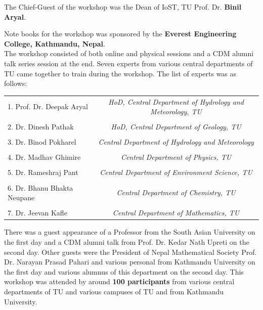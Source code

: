 \documentclass[a4paper,12pt]{report}
\begin{document}
\vspace{5mm}
\noindent
The Chief-Guest of the workshop was the Dean of IoST, TU Prof. Dr. \textbf{Binil Aryal}.
\clearpage

\noindent
Note books for the workshop was sponsored by the \textbf{Everest Engineering College, Kathmandu, Nepal}.\\
The workshop consisted of both online and physical sessions and a CDM alumni talk series session at the end. Seven experts from various central departments of TU came together to train during the workshop. The list of experts was as follows:


\begin{table}[h!]
\centering
  \begin{tcolorbox}[colframe=blue!52, colback=white, width=\linewidth]
\centering  \footnotesize
\begin{tabular}{l||c}

    1. Prof. Dr. Deepak Aryal &
    \textit{HoD, Central Department of Hydrology and Meteorology, TU}\\
    \\
    2. Dr. Dinesh Pathak &
    \textit{HoD, Central Department of Geology, TU}\\
    \\
    3. Dr. Binod Pokharel &
    \textit{Central Department of Hydrology and Meteorology}\\
    \\
    4. Dr. Madhav Ghimire &
    \textit{Central Department of Physics, TU}\\
    \\
    5. Dr. Rameshraj Pant &
    \textit{Central Department of Environment Science, TU}\\
    \\
    6. Dr. Bhanu Bhakta Neupane &
    \textit{Central Department of Chemistry, TU}\\
    \\
    7. Dr. Jeevan Kafle &
    \textit{Central Department of Mathematics, TU}\\
    \end{tabular}
  \end{tcolorbox}
\end{table}

\noindent
There was a guest appearance of a Professor from the South Asian University on the first day and a CDM alumni talk from Prof. Dr. Kedar Nath Upreti on the second day. Other guests were the President of Nepal Mathematical Society Prof. Dr. Narayan Prasad Pahari and various personal from Kathmandu University on the first day and various alumnus of this department on the second day. This workshop was attended by around \textbf{100 participants} from various central departments of TU and various campuses of TU and from Kathmandu University.
\end{document}
